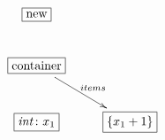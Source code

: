 $\xymatrix{
  \fbox{new} & \\
  \fbox{container} \ar[dr]^{items} & \\
  \fbox{$\mathit{int}\colon x_1$} & \fbox{$\{x_1 + 1\}$}
}$

